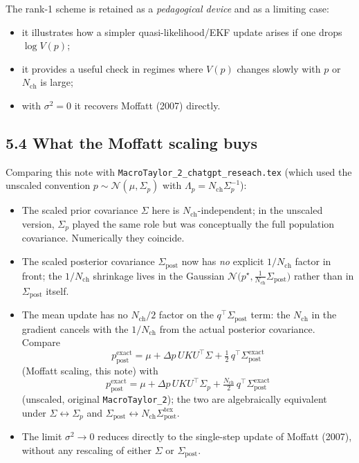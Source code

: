 \documentclass[11pt]{article}
\begin{document}
The rank-1 scheme is retained as a \emph{pedagogical device} and as a
limiting case:
\begin{itemize}
  \item it illustrates how a simpler quasi-likelihood/EKF update
        arises if one drops $\log V(p)$;
  \item it provides a useful check in regimes where $V(p)$ changes
        slowly with $p$ or $N_{\text{ch}}$ is large;
  \item with $\sigma^2 = 0$ it recovers Moffatt (2007) directly.
\end{itemize}

\subsection*{5.4 What the Moffatt scaling buys}

Comparing this note with \texttt{MacroTaylor\_2\_chatgpt\_reseach.tex}
(which used the unscaled convention $p \sim \mathcal{N}(\mu,\Sigma_p)$
with $\Lambda_p = N_{\text{ch}}\Sigma_p^{-1}$):

\begin{itemize}
  \item The scaled prior covariance $\Sigma$ here is
        $N_{\text{ch}}$-independent; in the unscaled version,
        $\Sigma_p$ played the same role but was conceptually the full
        population covariance.  Numerically they coincide.
  \item The scaled posterior covariance $\Sigma_{\text{post}}$ now has
        \emph{no} explicit $1/N_{\text{ch}}$ factor in front; the
        $1/N_{\text{ch}}$ shrinkage lives in the Gaussian
        $\mathcal{N}\bigl(p^\star, \tfrac{1}{N_{\text{ch}}}\Sigma_{\text{post}}\bigr)$
        rather than in $\Sigma_{\text{post}}$ itself.
  \item The mean update has no $N_{\text{ch}}/2$ factor on the
        $q^\top\Sigma_{\text{post}}$ term: the $N_{\text{ch}}$ in the
        gradient cancels with the $1/N_{\text{ch}}$ from the actual
        posterior covariance.  Compare
        \[
          p_{\text{post}}^{\text{exact}}
          =
          \mu + \Delta p\,UKU^\top\Sigma + \tfrac{1}{2}\,q^\top\Sigma_{\text{post}}^{\text{exact}}
        \]
        (Moffatt scaling, this note) with
        \[
          p_{\text{post}}^{\text{exact}}
          =
          \mu + \Delta p\,UKU^\top\Sigma_p + \tfrac{N_{\text{ch}}}{2}\,q^\top\Sigma_{\text{post}}^{\text{exact}}
        \]
        (unscaled, original \texttt{MacroTaylor\_2}); the two are
        algebraically equivalent under
        $\Sigma \leftrightarrow \Sigma_p$ and
        $\Sigma_{\text{post}} \leftrightarrow N_{\text{ch}}\Sigma_{\text{post}}^{\text{tex}}$.
  \item The limit $\sigma^2 \to 0$ reduces directly to the single-step
        update of Moffatt (2007), without any rescaling of either
        $\Sigma$ or $\Sigma_{\text{post}}$.
\end{itemize}
\end{document}
